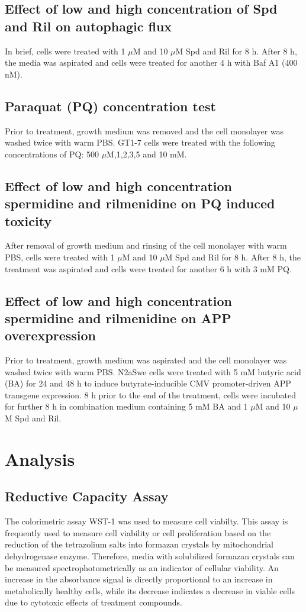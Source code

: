 \subsection{Effect of low and high concentration of Spd and Ril on autophagic flux}
In brief, cells were treated with 1 $\mu$M and 10 $\mu$M Spd and Ril for 8 h. After 8 h, the media was aspirated and cells were treated for another 4 h with Baf A1 (400 nM).

\subsection{Paraquat (PQ) concentration test}
Prior to treatment, growth medium was removed and the cell monolayer was washed twice with warm PBS. GT1-7 cells were treated with the following concentrations of PQ: 500 $\mu$M,1,2,3,5 and 10 mM. 

\subsection{Effect of low and high concentration spermidine and rilmenidine on PQ induced toxicity}
After removal of growth medium and rinsing of the cell monolayer with warm PBS, cells were treated with 1 $\mu$M and 10 $\mu$M Spd and Ril for 8 h. After 8 h, the treatment was aspirated and cells were treated for another 6 h with 3 mM PQ. 

\subsection{Effect of low and high concentration spermidine and rilmenidine on APP overexpression}
Prior to treatment, growth medium was aspirated and the cell monolayer was washed twice with warm PBS. N2aSwe cells were treated with 5 mM butyric acid (BA) for 24 and 48 h to induce butyrate-inducible CMV promoter-driven APP transgene expression. 8 h prior to the end of the treatment, cells were incubated for further 8 h in combination medium containing 5 mM BA and 1 $\mu$M and 10 $\mu$M Spd and Ril.

\section{Analysis}
\subsection{Reductive Capacity Assay}
The colorimetric assay WST-1 was used to measure cell viabilty. This assay is frequently used to measure cell viability or cell proliferation based on the reduction of the tetrazolium salts into formazan crystals by mitochondrial dehydrogenase enzyme. Therefore, media with solubilized formazan crystals can be measured spectrophotometrically as an indicator of cellular viability. An increase in the absorbance signal is directly proportional to an increase in metabolically healthy cells, while its decrease indicates a decrease in viable cells due to cytotoxic effects of treatment compounds. 

